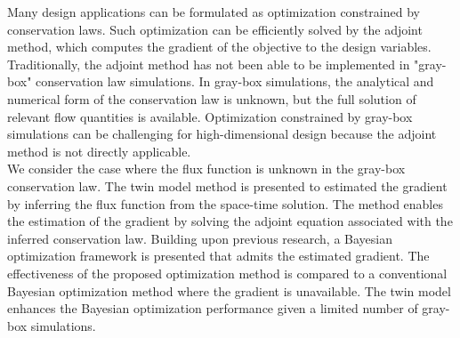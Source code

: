 % 
% 
%


Many design applications can be formulated as optimization constrained by conservation laws. Such optimization can be efficiently solved by the adjoint method, which computes the gradient of the objective to the design variables. Traditionally, the adjoint method has not been able to be implemented in "gray-box" conservation law simulations. In gray-box simulations, the analytical and numerical form of the conservation law is unknown, but the full solution of relevant flow quantities is available. Optimization constrained by gray-box simulations can be challenging for high-dimensional design because the adjoint method is not directly applicable.\\

We consider the case where the flux function is unknown in the gray-box conservation law. The twin model method is presented to estimated the gradient by inferring the flux function from the space-time solution. The method enables the estimation of the gradient by solving the adjoint equation associated with the inferred conservation law. Building upon previous research, a Bayesian optimization framework is presented that admits the estimated gradient. The effectiveness of the proposed optimization method is compared to a conventional Bayesian optimization method where the gradient is unavailable. 
The twin model enhances the Bayesian optimization performance given a limited number of gray-box simulations.

